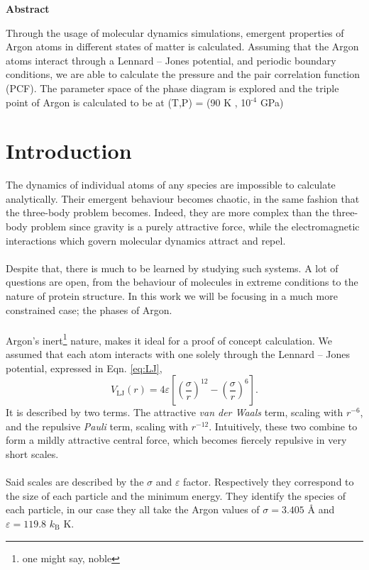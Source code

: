 \documentclass{IAYCPro}
\begin{document}
\begin{center}
    \textbf{Abstract}
\end{center}
\vspace{-1em}
Through the usage of molecular dynamics simulations, emergent properties of Argon atoms in different states of matter is calculated. Assuming that the Argon atoms interact through a Lennard -- Jones potential, and periodic boundary conditions, we are able to calculate the pressure and the pair correlation function (PCF). The parameter space of the phase diagram is explored and the triple point of Argon is calculated to be at (T,P) = (90 K , 10$^{\text{-4}}$ GPa) 

\section{Introduction}
\label{sct: Introduction}
The dynamics of individual atoms of any species are impossible to calculate analytically. Their emergent behaviour becomes chaotic, in the same fashion that the three-body problem becomes. Indeed, they are more complex than the three-body problem since gravity is a purely attractive force, while the electromagnetic interactions which govern molecular dynamics attract and repel. \\ \\
Despite that, there is much to be learned by studying such systems. A lot of questions are open, from the behaviour of molecules in extreme conditions to the nature of protein structure. In this work we will be focusing in a much more constrained case; the phases of Argon. \\ \\
Argon's inert\footnote{one might say, noble} nature, makes it ideal for a proof of concept calculation. We assumed that each atom interacts with one solely through the Lennard -- Jones potential, expressed in Eqn. \ref{eq:LJ},
\begin{equation}
    \label{eq:LJ}
    V_\text{LJ}(r) = 4\varepsilon \left[ \left( \frac{\sigma}{r} \right)^{12} - \left( \frac{\sigma}{r} \right)^6 \right].
\end{equation} 
It is described by two terms. The attractive \textit{van der Waals} term, scaling with $r^{-6}$, and the repulsive \textit{Pauli} term, scaling with $r^{-12}$. Intuitively, these two combine to form a mildly attractive central force, which becomes fiercely repulsive in very short scales. \\ \\
Said scales are described by the $\sigma$ and $\varepsilon$ factor. Respectively they correspond to the size of each particle and the minimum energy. They identify the species of each particle, in our case they all take the Argon values of $\sigma = 3.405$ \r{A} and $\varepsilon = 119.8$ $k_\text{B}$ K. 
\end{document}
